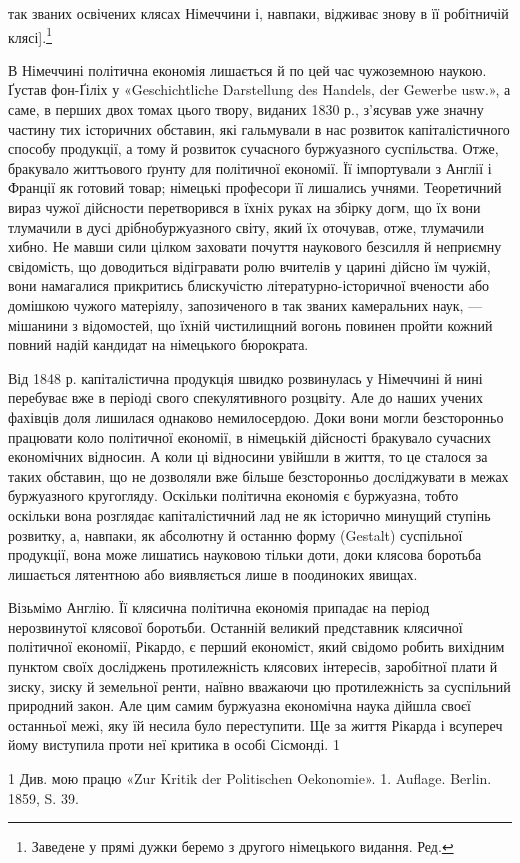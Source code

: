 так званих освічених клясах Німеччини і, навпаки, відживає
знову в її робітничій клясі].\footnote*{
Заведене у прямі дужки беремо з другого німецького видання. Ред.
}

В Німеччині політична економія лишається й по цей час чужоземною
наукою. Ґустав фон-Ґіліх у «Geschichtliche Darstellung
des Handels, der Gewerbe usw.», а саме, в перших двох томах
цього твору, виданих 1830 р., з’ясував уже значну частину тих
історичних обставин, які гальмували в нас розвиток капіталістичного
способу продукції, а тому й розвиток сучасного буржуазного
суспільства. Отже, бракувало життьового ґрунту для політичної
економії. Її імпортували з Англії і Франції як готовий товар;
німецькі професори її лишались учнями. Теоретичний вираз чужої
дійсности перетворився в їхніх руках на збірку догм, що їх
вони тлумачили в дусі дрібнобуржуазного світу, який їх оточував,
отже, тлумачили хибно. Не мавши сили цілком заховати почуття
наукового безсилля й неприємну свідомість, що доводиться
відігравати ролю вчителів у царині дійсно їм чужій, вони намагалися
прикритись блискучістю літературно-історичної вчености
або домішкою чужого матеріялу, запозиченого в так званих камеральних
наук, — мішанини з відомостей, що їхній чистилищний
вогонь повинен пройти кожний повний надій кандидат на
німецького бюрократа.

Від 1848 р. капіталістична продукція швидко розвинулась у
Німеччині й нині перебуває вже в періоді свого спекулятивного
розцвіту. Але до наших учених фахівців доля лишилася однаково
немилосердою. Доки вони могли безсторонньо працювати коло
політичної економії, в німецькій дійсності бракувало сучасних економічних
відносин. А коли ці відносини увійшли в життя, то це сталося
за таких обставин, що не дозволяли вже більше безсторонньо
досліджувати в межах буржуазного кругогляду. Оскільки політична
економія є буржуазна, тобто оскільки вона розглядає капіталістичний
лад не як історично минущий ступінь розвитку,
а, навпаки, як абсолютну й останню форму (Gestalt) суспільної
продукції, вона може лишатись науковою тільки доти, доки клясова
боротьба лишається лятентною або виявляється лише в
поодиноких явищах.

Візьмімо Англію. Її клясична політична економія припадає на
період нерозвинутої клясової боротьби. Останній великий представник
клясичної політичної економії, Рікардо, є перший економіст,
який свідомо робить вихідним пунктом своїх досліджень
протилежність клясових інтересів, заробітної плати й зиску, зиску
й земельної ренти, наївно вважаючи цю протилежність за суспільний
природний закон. Але цим самим буржуазна економічна
наука дійшла своєї останньої межі, яку їй несила було переступити.
Ще за життя Рікарда і всупереч йому виступила проти
неї критика в особі Сісмонді. 1

1 Див. мою працю «Zur Kritik der Politischen Oekonomie». 1. Auflage.
Berlin. 1859, S. 39.